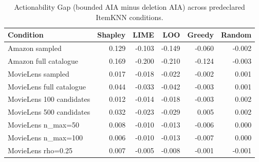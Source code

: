 \begin{table}[t]\centering\scriptsize
\caption{Actionability Gap (bounded AIA minus deletion AIA) across predeclared ItemKNN conditions.}
\label{tab:appC4}
\begin{tabular}{lrrrrr}
\toprule
Condition & Shapley & LIME & LOO & Greedy & Random \\
\midrule
Amazon sampled & 0.129 & -0.103 & -0.149 & -0.060 & -0.002 \\
Amazon full catalogue & 0.169 & -0.200 & -0.210 & -0.124 & -0.003 \\
MovieLens sampled & 0.017 & -0.018 & -0.022 & -0.002 & 0.001 \\
MovieLens full catalogue & 0.044 & -0.033 & -0.042 & -0.003 & 0.001 \\
MovieLens 100 candidates & 0.012 & -0.014 & -0.018 & -0.003 & 0.002 \\
MovieLens 500 candidates & 0.032 & -0.023 & -0.029 & 0.005 & 0.002 \\
MovieLens n_max=50 & 0.008 & -0.010 & -0.013 & -0.006 & 0.000 \\
MovieLens n_max=100 & 0.006 & -0.010 & -0.013 & -0.007 & 0.000 \\
MovieLens rho=0.25 & 0.007 & -0.005 & -0.008 & -0.001 & -0.001 \\
\bottomrule
\end{tabular}
\end{table}

